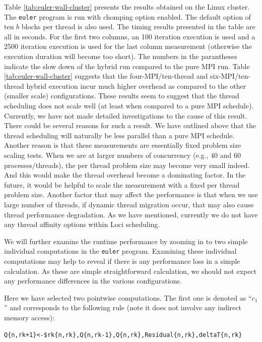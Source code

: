 \documentclass{article}
\begin{document}
Table \ref{tab:euler-wall-cluster} presents the results obtained on the
Linux cluster.  The \texttt{euler} program is run with chomping option
enabled.  The default option of ten $b$ blocks per thread is also used.
The timing results presented in the table are all in seconds.  For the
first two columns, an 100 iteration execution is used and a 2500
iteration execution is used for the last column measurement (otherwise
the execution duration will become too short).  The numbers in the
parantheses indicate the slow down of the hybrid run compared to the
pure MPI run. Table \ref{tab:euler-wall-cluster} suggests that the
four-MPI/ten-thread and six-MPI/ten-thread hybrid execution incur much
higher overhead as compared to the other (smaller scale) configurations.
These results seem to suggest that the thread scheduling does not scale
well (at least when compared to a pure MPI schedule).  Currently, we
have not made detailed investigations to the cause of this result.
There could be several reasons for such a result.  We have outlined
above that the thread scheduling will naturally be less parallel than a
pure MPI schedule.  Another reason is that these measurements are
essentially fixed problem size scaling tests.  When we are at larger
numbers of concurrency (e.g., 40 and 60 processes/threads), the per
thread problem size may become very small indeed.  And this would make
the thread overhead become a dominating factor.  In the future, it would
be helpful to scale the measurement with a fixed per thread problem
size.  Another factor that may affect the performance is that when we
use large number of threads, if dynamic thread migration occur, that may
also cause thread performance degradation.  As we have mentioned,
currently we do not have any thread affinity options within Loci
scheduling.  

We will further examine the runtime performance by zooming in to two
simple individual computations in the \texttt{euler} program.  Examining
these individual computations may help to reveal if there is any
performance loss in a simple calculation.  As these are simple
straightforward calculation, we should not expect any performance
differences in the various configurations.

Here we have selected two pointwise computations.  The first one is
denoted as ``$c_1$'' and corresponds to the following rule (note it does
not involve any indirect memory access):
\begin{verbatim}
Q{n,rk+1}<-$rk{n,rk},Q{n,rk-1},Q{n,rk},Residual{n,rk},deltaT{n,rk}
\end{verbatim}
\end{document}
